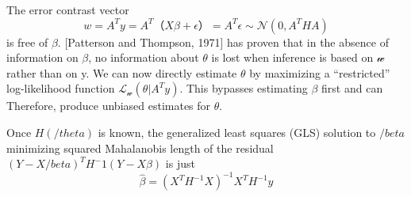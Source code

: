 \documentclass[a4paper,11pt]{article}
\begin{document}
The error contrast vector 
\begin{equation}\label{eq1} 
         w = A^T y = A^T（X \beta + \epsilon）= A^T \epsilon \sim \mathcal{N}(0,A^T H A)
\end{equation}
 is free of $\beta$. [Patterson and Thompson, 1971] has proven that in the absence of information on $\beta$, no information about $\theta$ is lost when inference is based on $\mathcal{w}$ rather than on y. We can now directly estimate $\theta$ by maximizing a “restricted” log-likelihood function $\mathcal{L_w}(\theta| A^T y)$. This bypasses estimating $\beta$ first and can Therefore, produce unbiased estimates for $\theta$.

Once $H(/theta)$ is known, the generalized least squares (GLS) solution to $/beta$ minimizing squared Mahalanobis length of the residual $(Y - X/beta)^T H^-1(Y - X\beta)$ is just
\begin{equation}\label{eq:mean} 
         \widehat{\beta} = (X^T H^{-1} X)^{-1} X^T H^{-1} y
\end{equation}
\end{document}
